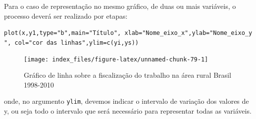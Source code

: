 \documentclass[12pt,portuguese,oneside]{book}
\newenvironment{Shaded}{\begin{snugshade}}{\end{snugshade}}
\newcommand{\KeywordTok}[1]{\textcolor[rgb]{0.13,0.29,0.53}{\textbf{#1}}}
\newcommand{\DataTypeTok}[1]{\textcolor[rgb]{0.13,0.29,0.53}{#1}}
\newcommand{\DecValTok}[1]{\textcolor[rgb]{0.00,0.00,0.81}{#1}}
\newcommand{\StringTok}[1]{\textcolor[rgb]{0.31,0.60,0.02}{#1}}
\newcommand{\OperatorTok}[1]{\textcolor[rgb]{0.81,0.36,0.00}{\textbf{#1}}}
\newcommand{\NormalTok}[1]{#1}
\begin{document}
Para o caso de representação no mesmo gráfico, de duas ou mais
variáveis, o processo deverá ser realizado por etapas:

\texttt{plot(x,y1,type="b",main="Título",\ xlab="Nome\_eixo\_x",ylab="Nome\_eixo\_y",\ col="cor\ das\ linhas",ylim=c(yi,ys))}

\begin{Shaded}
\end{Shaded}

\begin{figure}[H]

{\centering \texttt{[image: index\_files/figure-latex/unnamed-chunk-79-1]} 

}

\caption{Gráfico de linha sobre a fiscalização do trabalho na área rural Brasil 1998-2010}\label{fig:unnamed-chunk-79}
\end{figure}

onde, no argumento \texttt{ylim}, devemos indicar o intervalo de
variação dos valores de y, ou seja todo o intervalo que será necessário
para representar todas as variáveis.
\end{document}
